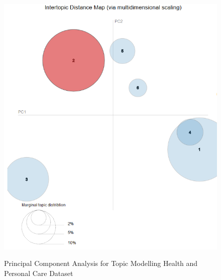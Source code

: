 

\begin{figure}[H]
  {\includegraphics[width = 0.85 \textwidth]{img/lda/2.PNG}}
  \caption{Principal Component Analysis for Topic Modelling Health and Personal Care Dataset}
\end{figure}



